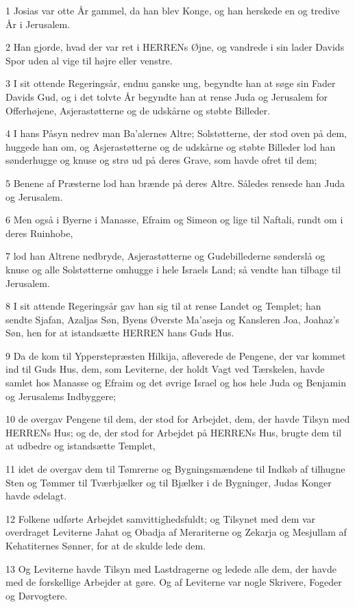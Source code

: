 \par 1 Josias var otte År gammel, da han blev Konge, og han herskede en og tredive År i Jerusalem.
\par 2 Han gjorde, hvad der var ret i HERRENs Øjne, og vandrede i sin lader Davids Spor uden al vige til højre eller venstre.
\par 3 I sit ottende Regeringsår, endnu ganske ung, begyndte han at søge sin Fader Davids Gud, og i det tolvte År begyndte han at rense Juda og Jerusalem for Offerhøjene, Asjerastøtterne og de udskårne og støbte Billeder.
\par 4 I hans Påsyn nedrev man Ba'alernes Altre; Solstøtterne, der stod oven på dem, huggede han om, og Asjerastøtterne og de udskårne og støbte Billeder lod han sønderhugge og knuse og strø ud på deres Grave, som havde ofret til dem;
\par 5 Benene af Præsterne lod han brænde på deres Altre. Således rensede han Juda og Jerusalem.
\par 6 Men også i Byerne i Manasse, Efraim og Simeon og lige til Naftali, rundt om i deres Ruinhobe,
\par 7 lod han Altrene nedbryde, Asjerastøtterne og Gudebillederne sønderslå og knuse og alle Solstøtterne omhugge i hele Israels Land; så vendte han tilbage til Jerusalem.
\par 8 I sit attende Regeringsår gav han sig til at rense Landet og Templet; han sendte Sjafan, Azaljas Søn, Byens Øverste Ma'aseja og Kansleren Joa, Joahaz's Søn, hen for at istandsætte HERREN hans Guds Hus.
\par 9 Da de kom til Ypperstepræsten Hilkija, afleverede de Pengene, der var kommet ind til Guds Hus, dem, som Leviterne, der holdt Vagt ved Tærskelen, havde samlet hos Manasse og Efraim og det øvrige Israel og hos hele Juda og Benjamin og Jerusalems Indbyggere;
\par 10 de overgav Pengene til dem, der stod for Arbejdet, dem, der havde Tilsyn med HERRENs Hus; og de, der stod for Arbejdet på HERRENs Hus, brugte dem til at udbedre og istandsætte Templet,
\par 11 idet de overgav dem til Tømrerne og Bygningsmændene til Indkøb af tilhugne Sten og Tømmer til Tværbjælker og til Bjælker i de Bygninger, Judas Konger havde ødelagt.
\par 12 Folkene udførte Arbejdet samvittighedsfuldt; og Tilsynet med dem var overdraget Leviterne Jahat og Obadja af Merariterne og Zekarja og Mesjullam af Kehatiternes Sønner, for at de skulde lede dem.
\par 13 Og Leviterne havde Tilsyn med Lastdragerne og ledede alle dem, der havde med de forskellige Arbejder at gøre. Og af Leviterne var nogle Skrivere, Fogeder og Dørvogtere.

